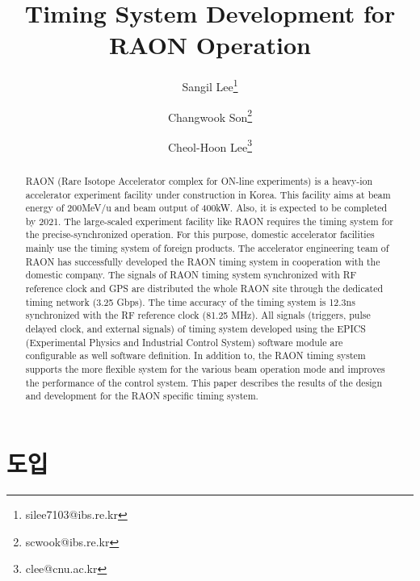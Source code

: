 \documentclass[11pt,a4paper]{article}
\begin{document}
\title{
\textbf{Timing System Development for RAON Operation} %
\vspace{0.5cm}
\Large
}
\author[1]{Sangil Lee\thanks{silee7103@ibs.re.kr}}
\author[2]{Changwook Son\thanks{scwook@ibs.re.kr}}
\author[3]{Cheol-Hoon Lee\thanks{clee@cnu.ac.kr}}
\date{}
\maketitle
\vspace{2em}

\begin{abstract}
RAON (Rare Isotope Accelerator complex for ON-line experiments) is a heavy-ion accelerator experiment facility under construction in Korea. This facility aims at beam energy of 200MeV/u and beam output of 400kW. Also, it is expected to be completed by 2021. The large-scaled experiment facility like RAON requires the timing system for the precise-synchronized operation. For this purpose, domestic accelerator facilities mainly use the timing system of foreign products. The accelerator engineering team of RAON has successfully developed the RAON timing system in cooperation with the domestic company. The signals of RAON timing system synchronized with RF reference clock and GPS are distributed the whole RAON site through the dedicated timing network (3.25 Gbps). The time accuracy of the timing system is 12.3ns synchronized with the RF reference clock (81.25 MHz). All signals (triggers, pulse delayed clock, and external signals) of timing system developed using the EPICS (Experimental Physics and Industrial Control System) software module are configurable as well software definition. In addition to, the RAON timing system supports the more flexible system for the various beam operation mode and improves the performance of the control system. \newline
This paper describes the results of the design and development for the RAON specific timing system.
\end{abstract}

\newpage

\section{도입}
\end{document}
